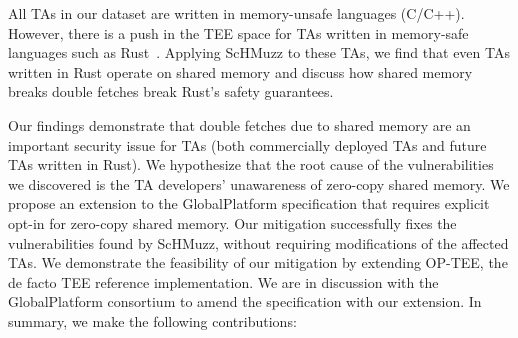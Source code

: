 \documentclass[conference]{IEEEtran} %
\newcommand{\sysname}{ScHMuzz\xspace}
\newcommand{\optee}{OP-TEE\xspace}
\providecommand{\DIFaddtex}[1]{{\protect\color{blue} \sf #1}} %
\providecommand{\DIFdeltex}[1]{{\protect\color{red} \scriptsize #1}} %
\providecommand{\DIFaddbegin}{} %
\providecommand{\DIFaddend}{} %
\providecommand{\DIFdelbegin}{} %
\providecommand{\DIFdelend}{} %
\providecommand{\DIFadd}[1]{\texorpdfstring{\DIFaddtex{#1}}{#1}} %
\providecommand{\DIFdel}[1]{\texorpdfstring{\DIFdeltex{#1}}{}} %
\begin{document}
All TAs in our dataset are written in memory-unsafe languages (C/C++). 
However, there is a push in the TEE space for TAs written in memory-safe languages such as 
Rust~\cite{rustee,teaclave}. Applying \sysname to these TAs, we find that even TAs written 
in Rust operate on shared memory and discuss how shared memory \DIFdelbegin \DIFdel{breaks }\DIFdelend \DIFaddbegin \DIFadd{double fetches break 
}\DIFaddend Rust's safety guarantees.

Our findings demonstrate that double fetches due to shared memory are an important 
security issue for TAs (both commercially deployed TAs and future TAs written in Rust). 
We hypothesize that the root cause of the vulnerabilities we discovered is the 
TA developers' unawareness of zero-copy shared memory. 
We propose an extension to the GlobalPlatform specification that requires explicit opt-in for 
zero-copy shared memory. Our mitigation successfully fixes the vulnerabilities found by \sysname, 
without requiring modifications of the affected TAs. We demonstrate the feasibility of our mitigation 
by extending \optee, the de facto TEE reference implementation. We are in discussion 
with the GlobalPlatform consortium to amend the specification with our extension.
In summary, we make the following contributions:
\end{document}
